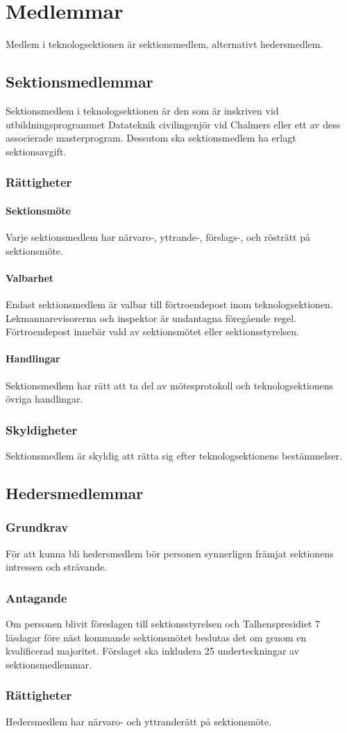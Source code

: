 \section{Medlemmar}
\label{sec:medlemmar}
Medlem i teknologsektionen är sektionsmedlem, alternativt hedersmedlem.
\subsection{Sektionsmedlemmar}
Sektionsmedlem i teknologsektionen är den som är inskriven vid utbildningsprogrammet Datateknik civilingenjör vid Chalmers eller ett av dess associerade masterprogram. Dessutom ska sektionsmedlem ha erlagt sektionsavgift.
\subsubsection{Rättigheter}
\paragraph{Sektionsmöte}
Varje sektionsmedlem har närvaro-, yttrande-, förslags-, och rösträtt på sektionsmöte.
\paragraph{Valbarhet}
\label{sec:medlemmar_valbarhet}
Endast sektionsmedlem är valbar till förtroendepost inom teknologsektionen. Lekmannarevisorerna och inspektor är undantagna föregående regel. Förtroendepost innebär vald av sektionsmötet eller sektionsstyrelsen.
\paragraph{Handlingar}
Sektionsmedlem har rätt att ta del av mötesprotokoll och teknologsektionens övriga handlingar.
\subsubsection{Skyldigheter}
Sektionsmedlem är skyldig att rätta sig efter teknologsektionens bestämmelser.
\subsection{Hedersmedlemmar}
\subsubsection{Grundkrav}
För att kunna bli hedersmedlem bör personen synnerligen främjat sektionens intressen och strävande.
\subsubsection{Antagande}
Om personen blivit föreslagen till sektionsstyrelsen och Talhenspresidiet 7 läsdagar före näst kommande sektionsmötet beslutas det om genom en kvalificerad majoritet.
Förslaget ska inkludera 25 underteckningar av sektionsmedlemmar.
\subsubsection{Rättigheter}
Hedersmedlem har närvaro- och yttranderätt på sektionsmöte.
